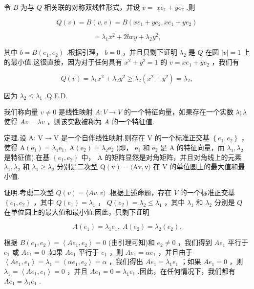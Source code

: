 令 \(B\) 为与 \(Q\) 相关联的对称双线性形式，并设 \(v = \; x{e}_{1} + y{e}_{2}\) .则

\[
Q\left( v\right)  = B\left( {v,v}\right)  = B\left( {x{e}_{1} + y{e}_{2},x{e}_{1} + y{e}_{2}}\right)
\]

\[
= {\lambda }_{1}{x}^{2} + {2bxy} + {\lambda }_{2}{y}^{2},
\]

其中 \(b = B\left( {{e}_{1},{e}_{2}}\right)\) .根据引理， \(b = 0\) ，并且只剩下证明 \({\lambda }_{2}\) 是 \(Q\) 在圆 \(\left| v\right|  = 1\) 上的最小值.这很直接，因为对于任何具有 \({x}^{2} + {y}^{2} = 1\) 的 \(v = x{e}_{1} + y{e}_{2}\) ，我们有

\[
Q\left( v\right)  = {\lambda }_{1}{x}^{2} + {\lambda }_{2}{y}^{2} \geq  {\lambda }_{2}\left( {{x}^{2} + {y}^{2}}\right)  = {\lambda }_{2},
\]

因为 \({\lambda }_{2} \leq  {\lambda }_{1}\) .Q.E.D.

我们称向量 \(v \neq  0\) 是线性映射 \(A : V \rightarrow  V\) 的一个特征向量，如果存在一个实数 \(\lambda ;\lambda\) 使得 \({Av} = {\lambda v}\) ，则该实数被称为 \(A\) 的一个特征值.

定理.设 A: \(\mathrm{V} \rightarrow  \mathrm{V}\) 是一个自伴线性映射.则存在 \(\mathrm{V}\) 的一个标准正交基 \(\left\{  {{e}_{1},{e}_{2}}\right\}\) ，使得 \(\mathrm{A}\left( {\mathrm{e}}_{1}\right)  = {\lambda }_{1}{\mathrm{e}}_{1},\mathrm{\;A}\left( {\mathrm{e}}_{2}\right)  = {\lambda }_{2}{\mathrm{e}}_{2}\) (即， \({\mathrm{e}}_{1}\) 和 \({\mathrm{e}}_{2}\) 是 \(\mathrm{A}\) 的特征向量，而 \({\lambda }_{1},{\lambda }_{2}\) 是特征值).在基 \(\left\{  {{e}_{1},{e}_{2}}\right\}\) 中， \(\mathrm{A}\) 的矩阵显然是对角矩阵，并且对角线上的元素 \({\lambda }_{1},{\lambda }_{2}\) 和 \({\lambda }_{1} \geq  {\lambda }_{2}\) 分别是二次型 \(\mathrm{Q}\left( \mathrm{v}\right)  = \langle \mathrm{{Av}},\mathrm{v}\rangle\) 在 \(\mathrm{V}\) 的单位圆上的最大值和最小值.

证明.考虑二次型 \(Q\left( v\right)  = \langle {Av},v\rangle\) .根据上述命题，存在 \(V\) 的一个标准正交基 \(\left\{  {{e}_{1},{e}_{2}}\right\}\) ，其中 \(Q\left( {e}_{1}\right)  = {\lambda }_{1}\) ， \(Q\left( {e}_{2}\right)  = {\lambda }_{2} \leq  {\lambda }_{1}\) ，其中 \({\lambda }_{1}\) 和 \({\lambda }_{2}\) 分别是 \(Q\) 在单位圆上的最大值和最小值.因此，只剩下证明

\[
A\left( {e}_{1}\right)  = {\lambda }_{1}{e}_{1},\;A\left( {e}_{2}\right)  = {\lambda }_{2}\left( {e}_{2}\right) .
\]

根据 \(B\left( {{e}_{1},{e}_{2}}\right)  = \left\langle  {A{e}_{1},{e}_{2}}\right\rangle   = 0\) (由引理可知)和 \({e}_{2} \neq  0\) ，我们得到 \(A{e}_{1}\) 平行于 \({e}_{1}\) 或 \(A{e}_{1} = 0\) .如果 \(A{e}_{1}\) 平行于 \({e}_{1}\) ，则 \(A{e}_{1} = \alpha {e}_{1}\) ，并且由于 \(\left\langle  {A{e}_{1},{e}_{1}}\right\rangle   = {\lambda }_{1} = \left\langle  {\alpha {e}_{1},{e}_{2}}\right\rangle   = \alpha\) ，我们得出 \(A{e}_{1} = {\lambda }_{1}{e}_{1}\) ；如果 \(A{e}_{1} = 0\) ，则 \({\lambda }_{1} = \left\langle  {A{e}_{1},{e}_{1}}\right\rangle   = 0\) ，并且 \(A{e}_{1} = 0 = {\lambda }_{1}{e}_{1}\) .因此，在任何情况下，我们都有 \(A{e}_{1} = {\lambda }_{1}{e}_{1}\) .

